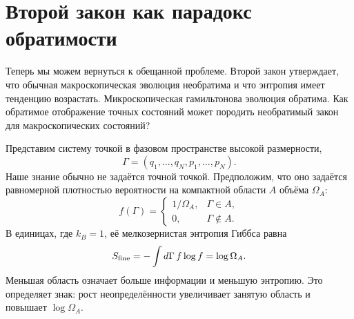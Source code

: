 \begin{classroomqa}
\end{classroomqa}

\section{Второй закон как парадокс обратимости}

Теперь мы можем вернуться к обещанной проблеме. Второй закон утверждает, что обычная макроскопическая эволюция необратима и что энтропия имеет тенденцию возрастать. Микроскопическая гамильтонова эволюция обратима. Как обратимое отображение точных состояний может породить необратимый закон для макроскопических состояний?

Представим систему точкой в фазовом пространстве высокой размерности,
\[
 \Gamma=(q_1,\ldots,q_N,p_1,\ldots,p_N).
\]
Наше знание обычно не задаётся точной точкой. Предположим, что оно задаётся равномерной плотностью вероятности на компактной области \(A\) объёма \(\Omega_A\):
\begin{equation}
 f(\Gamma)=
 \begin{cases}
  1/\Omega_A,&\Gamma\in A,\\
  0,&\Gamma\notin A.
 \end{cases}
 \label{eq:sm7-uniform-blob}
\end{equation}
В единицах, где \(k_B=1\), её мелкозернистая энтропия Гиббса равна
\begin{equation}
 S_{\rm fine}
 =-\int d\Gamma\,f\log f
 =\log\Omega_A.
 \label{eq:sm7-blob-entropy}
\end{equation}
Меньшая область означает больше информации и меньшую энтропию. Это определяет знак: рост неопределённости увеличивает занятую область и повышает \(\log\Omega_A\).

